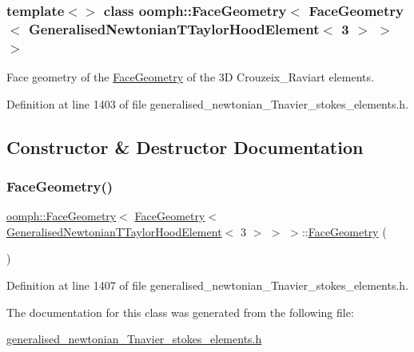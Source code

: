 \subsubsection*{template$<$$>$\newline
class oomph\+::\+Face\+Geometry$<$ Face\+Geometry$<$ Generalised\+Newtonian\+T\+Taylor\+Hood\+Element$<$ 3 $>$ $>$ $>$}

Face geometry of the \hyperlink{classoomph_1_1FaceGeometry}{Face\+Geometry} of the 3D Crouzeix\+\_\+\+Raviart elements. 

Definition at line 1403 of file generalised\+\_\+newtonian\+\_\+\+Tnavier\+\_\+stokes\+\_\+elements.\+h.



\subsection{Constructor \& Destructor Documentation}
\mbox{\label{classoomph_1_1FaceGeometry_3_01FaceGeometry_3_01GeneralisedNewtonianTTaylorHoodElement_3_013_01_4_01_4_01_4_a9945d4b7f2c9bc4d2ac5166bc30eb69d}} 
\subsubsection{\texorpdfstring{Face\+Geometry()}{FaceGeometry()}}
{\footnotesize\ttfamily \hyperlink{classoomph_1_1FaceGeometry}{oomph\+::\+Face\+Geometry}$<$ \hyperlink{classoomph_1_1FaceGeometry}{Face\+Geometry}$<$ \hyperlink{classoomph_1_1GeneralisedNewtonianTTaylorHoodElement}{Generalised\+Newtonian\+T\+Taylor\+Hood\+Element}$<$ 3 $>$ $>$ $>$\+::\hyperlink{classoomph_1_1FaceGeometry}{Face\+Geometry} (\begin{DoxyParamCaption}{ }\end{DoxyParamCaption})\hspace{0.3cm}{\ttfamily [inline]}}



Definition at line 1407 of file generalised\+\_\+newtonian\+\_\+\+Tnavier\+\_\+stokes\+\_\+elements.\+h.



The documentation for this class was generated from the following file\+:\begin{DoxyCompactItemize}
\item 
\hyperlink{generalised__newtonian__Tnavier__stokes__elements_8h}{generalised\+\_\+newtonian\+\_\+\+Tnavier\+\_\+stokes\+\_\+elements.\+h}\end{DoxyCompactItemize}

